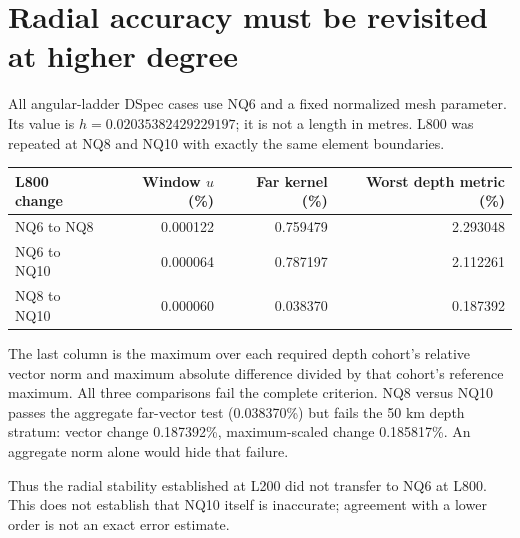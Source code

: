\documentclass[11pt,a4paper]{article}
\begin{document}
\newpage
\section{Radial accuracy must be revisited at higher degree}
All angular-ladder DSpec cases use NQ6 and a fixed normalized mesh parameter. Its value is $h=0.02035382429229197$; it is not a length in metres. L800 was repeated at NQ8 and NQ10 with exactly the same element boundaries.
\begin{center}\small\begin{tabular}{lrrr}\toprule
L800 change & Window $u$ (\%) & Far kernel (\%) & Worst depth metric (\%)\\\midrule
NQ6 to NQ8 & 0.000122 & 0.759479 & 2.293048 \\
NQ6 to NQ10 & 0.000064 & 0.787197 & 2.112261 \\
NQ8 to NQ10 & 0.000060 & 0.038370 & 0.187392 \\
\bottomrule\end{tabular}\end{center}
The last column is the maximum over each required depth cohort's relative vector norm and maximum absolute difference divided by that cohort's reference maximum. All three comparisons fail the complete criterion. NQ8 versus NQ10 passes the aggregate far-vector test (0.038370\%) but fails the 50 km depth stratum: vector change 0.187392\%, maximum-scaled change 0.185817\%. An aggregate norm alone would hide that failure.

Thus the radial stability established at L200 did not transfer to NQ6 at L800. This does not establish that NQ10 itself is inaccurate; agreement with a lower order is not an exact error estimate.
\end{document}
